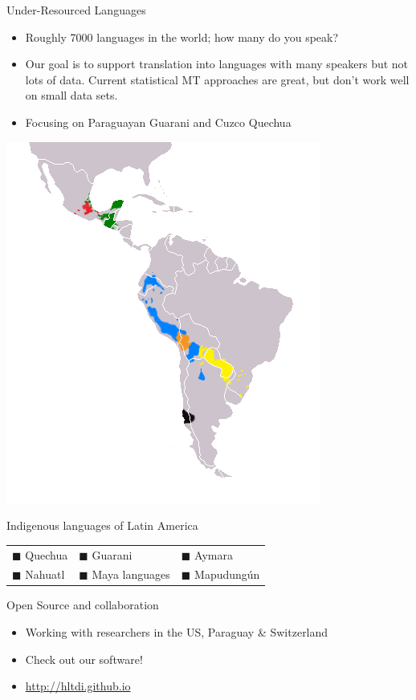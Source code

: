 \documentclass[final]{beamer}
\begin{document}
\begin{frame}{}
\begin{columns}[t]
  \begin{column}{.33\linewidth}
  \vfill
  \begin{block}{\large Under-Resourced Languages}
    \begin{itemize}
    \item Roughly 7000 languages in the world; how many do you speak?
    \item Our goal is to support translation into languages with many speakers
    but not lots of data. Current statistical MT approaches are great, but
    don't work well on small data sets.
    \item Focusing on Paraguayan Guarani and Cuzco Quechua
    \end{itemize}
  \end{block}

  \centering
  \includegraphics[width=.33\linewidth]{Map-Most_Widely_Spoken_Native_Languages_in_Latin_America.png}
  \begin{block}{Indigenous languages of Latin America}
    \begin{tabular}{lll}
      {\color{blue}    $\blacksquare$} Quechua &
      {\color{yellow}  $\blacksquare$} Guarani &
      {\color{orange}  $\blacksquare$} Aymara \\
      {\color{red}     $\blacksquare$} Nahuatl &
      {\color{green}   $\blacksquare$} Maya languages &
      {\color{black}   $\blacksquare$} Mapudungún
    \end{tabular}
  \end{block}

  \begin{block}{\large Open Source and collaboration}
    \centering
    \begin{itemize}
    \item Working with researchers in the US, Paraguay \& Switzerland
    \item Check out our software!
    \item \url{http://hltdi.github.io}
    \end{itemize}
  \end{block}



\end{column}
\end{columns}
\end{frame}
\end{document}

